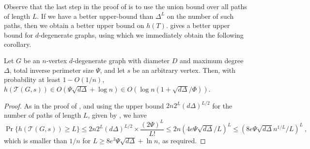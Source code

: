 \documentclass{patmorin}
\newcommand{\tcal}{\mathcal{T}}
\begin{document}
Observe that the last step in the proof of
 is to use the union bound over all
paths of length $L$.  If we have a better upper-bound than $\Delta^L$ on
the number of such paths, then we obtain a better upper bound on $h(T)$.
 gives a better upper bound for $d$-degenerate graphs, using which we immediately obtain the following corollary.

\begin{cor}
  Let $G$ be an $n$-vertex $d$-degenerate graph with diameter $D$
  and maximum degree $\Delta$, total inverse perimeter size $\Psi$,
  and let $s$ be an arbitrary vertex.
  Then, with probability at least $1-O(1/n)$,
  $h(\tcal(G,s))\in O(\Psi\sqrt{d\Delta}+\log n)
  \in O(\log n (1+ \sqrt{d\Delta}/\Phi))$.
\end{cor}

\begin{proof}
As in the proof of ,
and using the upper bound 
$2n2^{L}(d\Delta)^{L/2}$ for the number of paths of length $L$, given by , we have
   \[
        \Pr\{h(\tcal(G,s)) \ge L\} \le  2n2^{L}(d\Delta)^{L/2}\times
        \frac{(2\Psi)^L}{L!} \leq
        2n\left( 4e\Psi\sqrt{d\Delta}/L \right)^L
        \leq
        \left( 8e\Psi\sqrt{d\Delta}n^{1/L}/L \right)^L\:,
    \]
    which is smaller than $1/n$ for $L\geq 8e^3 \Psi \sqrt{d\Delta}+\ln n$, as required.
\end{proof}

\end{document}
